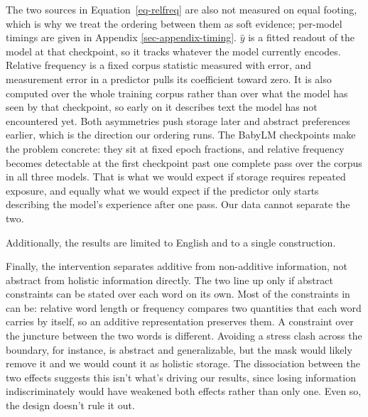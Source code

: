\documentclass[11pt]{article}
\begin{document}
The two sources in Equation~\ref{eq-relfreq} are also not measured on
equal footing, which is why we treat the ordering between them as soft
evidence; per-model timings are given in Appendix
\ref{sec-appendix-timing}. \(\hat{y}\) is a fitted readout of the model
at that checkpoint, so it tracks whatever the model currently encodes.
Relative frequency is a fixed corpus statistic measured with error, and
measurement error in a predictor pulls its coefficient toward zero. It
is also computed over the whole training corpus rather than over what
the model has seen by that checkpoint, so early on it describes text the
model has not encountered yet. Both asymmetries push storage later and
abstract preferences earlier, which is the direction our ordering runs.
The BabyLM checkpoints make the problem concrete: they sit at fixed
epoch fractions, and relative frequency becomes detectable at the first
checkpoint past one complete pass over the corpus in all three models.
That is what we would expect if storage requires repeated exposure, and
equally what we would expect if the predictor only starts describing the
model's experience after one pass. Our data cannot separate the two.

Additionally, the results are limited to English and to a single
construction.

Finally, the intervention separates additive from non-additive
information, not abstract from holistic information directly. The two
line up only if abstract constraints can be stated over each word on its
own. Most of the constraints in \citet{morgan2016} can be: relative word
length or frequency compares two quantities that each word carries by
itself, so an additive representation preserves them. A constraint over
the juncture between the two words is different. Avoiding a stress clash
across the boundary, for instance, is abstract and generalizable, but
the mask would likely remove it and we would count it as holistic
storage. The dissociation between the two effects suggests this isn't
what's driving our results, since losing information indiscriminately
would have weakened both effects rather than only one. Even so, the
design doesn't rule it out.


\clearpage

\onecolumn

\appendix
\end{document}
